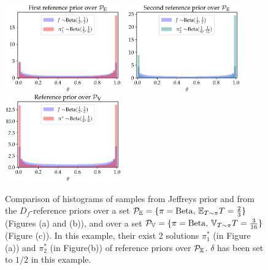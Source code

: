 \begin{figure}
    \centering%
    \includegraphics[width=5cm]{figures/generalized-ref/firstPe.pdf}\hspace*{0.5cm}%
    \includegraphics[width=5cm]{figures/generalized-ref/secondPe.pdf}\hspace*{0.5cm}%
    \includegraphics[width=5cm]{figures/generalized-ref/Pv.pdf}\\
    \caption{Comparison of histograms of samples from Jeffreys prior and from the $D_f$-reference priors over a set $\mathcal{P}_{\mathbb{E}}=\{\pi=\mathrm{Beta},\,\mathbb{E}_{T\sim\pi}T=\frac{2}{3}\}$ (Figures (a) and (b)), and over a set $\mathcal{P}_{\mathbb{V}}=\{\pi=\mathrm{Beta},\,\mathbb{V}_{T\sim\pi}T=\frac{3}{16}\}$ (Figure (c)). In this example, their exist 2 solutions $\pi_1^\ast$ (in Figure (a)) and $\pi_2^\ast$ (in Figure(b)) of reference priors over $\mathcal{P}_{\mathbb{E}}$. $\delta$ has been set to $1/2$ in this example.}
    \label{fig:exbeta}
\end{figure}





